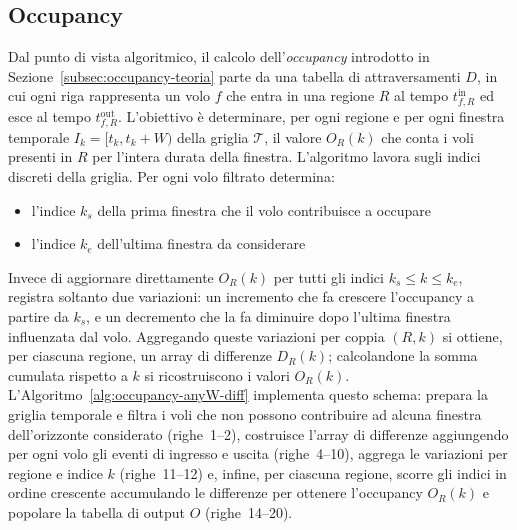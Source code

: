 \subsection{Occupancy}
\label{subsec:occupancy-impl}
Dal punto di vista algoritmico, il calcolo dell’\emph{occupancy} introdotto in Sezione~\ref{subsec:occupancy-teoria} parte da una tabella di attraversamenti \(D\), in cui ogni riga rappresenta un volo \(f\) che entra in una regione \(R\) al tempo \(t^{\mathrm{in}}_{f,R}\) ed esce al tempo \(t^{\mathrm{out}}_{f,R}\).  
L’obiettivo è determinare, per ogni regione e per ogni finestra temporale \(I_k = [t_k, t_k+W)\) della griglia \(\mathcal{T}\), il valore \(O_R(k)\) che conta i voli presenti in \(R\) per l’intera durata della finestra. 
L’algoritmo lavora sugli indici discreti della griglia. Per ogni volo filtrato determina:
\begin{itemize}
  \item l’indice \(k_s\) della prima finestra che il volo contribuisce a occupare
  \item l’indice \(k_e\) dell’ultima finestra da considerare
\end{itemize}
Invece di aggiornare direttamente \(O_R(k)\) per tutti gli indici \(k_s \le k \le k_e\), registra soltanto due variazioni: un incremento che fa crescere l’occupancy a partire da \(k_s\), e un decremento che la fa diminuire dopo l’ultima finestra influenzata dal volo.  
Aggregando queste variazioni per coppia \((R,k)\) si ottiene, per ciascuna regione, un array di differenze \(D_R(k)\); calcolandone la somma cumulata rispetto a \(k\) si ricostruiscono i valori \(O_R(k)\).  L’Algoritmo~\ref{alg:occupancy-anyW-diff} implementa questo schema: prepara la griglia temporale e filtra i voli che non possono contribuire ad alcuna finestra dell’orizzonte considerato (righe~1–2), costruisce l’array di differenze aggiungendo per ogni volo gli eventi di ingresso e uscita (righe~4–10), aggrega le variazioni per regione e indice \(k\) (righe~11–12) e, infine, per ciascuna regione, scorre gli indici in ordine crescente accumulando le differenze per ottenere l’occupancy \(O_R(k)\) e popolare la tabella di output \(O\) (righe~14–20).

